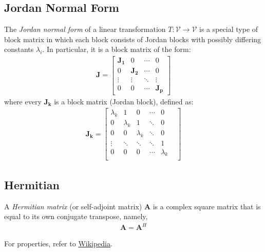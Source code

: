 \subsection{Jordan Normal Form}
\begin{definition} The \emph{Jordan normal form} of a linear transformation $T: \mathcal{V}\rightarrow\mathcal{V}$ is a special type of block matrix in which each block consists of Jordan blocks with possibly differing constants $\lambda_i$. In particular, it is a block matrix of the form:
  \begin{align}
    \bm{J}=
    \begin{bmatrix}
    \bm{J_1} & 0        & \cdots & 0\\
    0        & \bm{J_2} & \cdots & 0\\
    \vdots   & \vdots  & \ddots & \vdots\\
    0        & 0  &  \cdots    & \bm{J_p}
    \end{bmatrix}
  \end{align}
  where every $\bm{J_k}$ is a block matrix (Jordan block), defined as:
  \begin{align}
    \bm{J_k}=\begin{bmatrix}
      \lambda_k & 1        & 0         & \cdots & 0         &\\    %
      0        & \lambda_k & 1         & \ddots & 0         &\\    %
      0        & 0         & \lambda_k & \ddots & 0         &\\    %
      \vdots   & \ddots    & \ddots    & \ddots & 1         &\\   %
      0        & 0         & 0         & \cdots & \lambda_k &\\   %
    \end{bmatrix}
  \end{align}
\end{definition}

\subsection{Hermitian}
\begin{definition}
  A \emph{Hermitian matrix} (or self-adjoint matrix) $\bm{A}$ is a complex square matrix that is equal to its own conjugate transpose, namely,
  \begin{align}
    \bm{A}=\bm{A}^H
  \end{align}
\end{definition}
\noindent For properties, refer to \href{https://en.wikipedia.org/wiki/Hermitian_matrix#Properties}{Wikipedia}.
